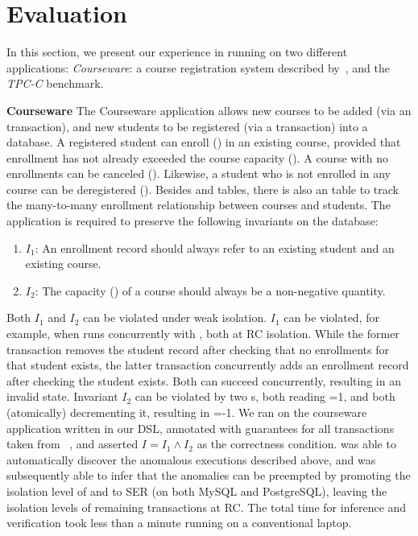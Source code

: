 \section{Evaluation}
\label{sec:case-studies}

In this section, we present our experience in running \tool on two
different applications: \emph{Courseware}: a course registration
system described by~\cite{gotsmanpopl16}, and the \emph{TPC-C}
benchmark.

\textbf{Courseware} The Courseware application allows new courses to be
added (via an  transaction), and new students to be
registered (via a  transaction) into a database. A registered
student can enroll () in an existing course,
provided that enrollment has not already exceeded the course
capacity (). A course with no enrollments can be
canceled (). Likewise, a student who is not enrolled
in any course can be deregistered (). Besides
 and  tables, there is also an 
table to track the many-to-many enrollment relationship between courses
and students. The application is required to preserve the following
invariants on the database:

\begin{enumerate}
\item  $I_1$: An enrollment record should always refer to an existing student and an existing course.
\item  $I_2$: The capacity () of a course should always be a
  non-negative quantity.
\end{enumerate}
\noindent Both $I_1$ and $I_2$ can be violated under weak
isolation. $I_1$ can be violated, for example, when
 runs concurrently with , both at RC
isolation. While the former transaction removes the student record
after checking that no enrollments for that student exists, the latter
transaction concurrently adds an enrollment record after checking the
student exists.  Both can succeed concurrently, resulting in an
invalid state. Invariant $I_2$ can be violated by two s,
both reading =1, and both (atomically) decrementing it,
resulting in =-1.  We ran \tool on the courseware
application written in our DSL, annotated with guarantees for all
transactions taken from ~\cite{gotsmanpopl16}, and asserted $I = I_1
\wedge I_2$ as the correctness condition. \tool was able to
automatically discover the anomalous executions described above, and
was subsequently able to infer that the anomalies can be preempted by
promoting the isolation level of  and
 to SER (on both MySQL and PostgreSQL), leaving
the isolation levels of remaining transactions at RC.  The total time
for inference and verification took less than a minute running on a
conventional laptop.

